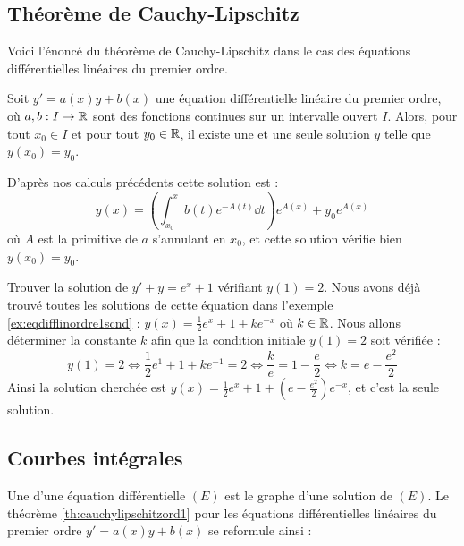 \documentclass[class=report,crop=false]{standalone}
\begin{document}
\subsection{Théorème de Cauchy-Lipschitz}


Voici l'énoncé du théorème de Cauchy-Lipschitz dans le cas des
équations différentielles linéaires du premier ordre.
\begin{theoreme}
\label{th:cauchylipschitzord1}
Soit $y'=a(x)y + b(x)$ une équation différentielle linéaire du premier ordre,
où $a,b : I \to \mathbb{R}$ sont des fonctions continues sur un intervalle ouvert $I$.
Alors, pour tout $x_0 \in I$ et pour tout $y_0 \in \mathbb{R}$, il existe une et une
seule solution $y$ telle que $y(x_0)=y_0$.
\end{theoreme}

D'après nos calculs précédents cette solution est :
$$y(x) = \left(\int_{x_0}^x b(t)e^{-A(t)}\dd t \right)e^{A(x)} + y_0e^{A(x)}$$
où $A$ est la primitive de $a$ s'annulant en $x_0$, et cette solution vérifie bien $y(x_0)=y_0$.


\begin{exemple}
Trouver la solution de $y'+y = e^x+1$ vérifiant $y(1)=2$.
Nous avons déjà trouvé toutes les solutions de cette équation dans l'exemple
\ref{ex:eqdifflinordre1scnd} : $y(x) = \frac12e^{x}+1 + k e^{-x}$
où $k\in\mathbb{R}$. Nous allons déterminer la constante $k$ afin que la condition initiale
$y(1)=2$ soit vérifiée :
$$y(1)=2 \iff \frac12e^{1}+1 + k e^{-1} = 2 \iff \frac{k}{e} = 1 - \frac{e}{2}
\iff k = e - \frac{e^2}{2}$$
Ainsi la solution cherchée est $y(x) = \frac12e^{x}+1 + \left(e - \frac{e^2}{2}\right)e^{-x}$,
et c'est la seule solution.
\end{exemple}

\subsection{Courbes intégrales}

Une  d'une équation différentielle $(E)$
est le graphe d'une solution de $(E)$.
Le théorème \ref{th:cauchylipschitzord1} pour les équations
différentielles linéaires du premier ordre $y'=a(x)y + b(x)$
se reformule ainsi :
\end{document}
